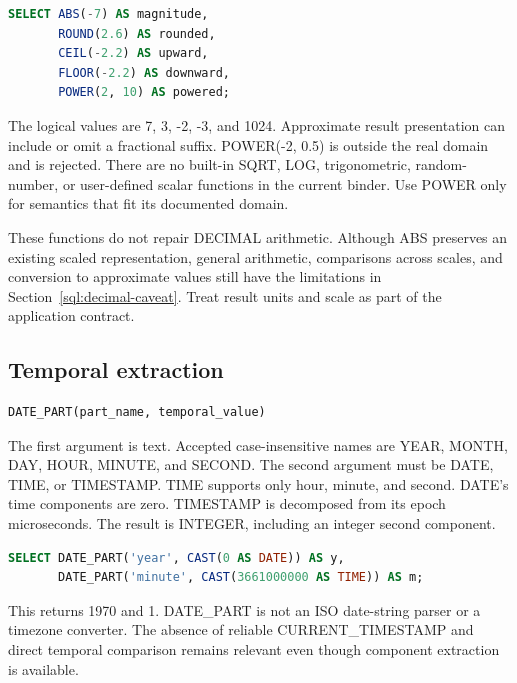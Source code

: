 \begin{lstlisting}[language=SQL]
SELECT ABS(-7) AS magnitude,
       ROUND(2.6) AS rounded,
       CEIL(-2.2) AS upward,
       FLOOR(-2.2) AS downward,
       POWER(2, 10) AS powered;
\end{lstlisting}

The logical values are 7, 3, -2, -3, and 1024. Approximate result presentation can include or omit a fractional suffix. POWER(-2, 0.5) is outside the real domain and is rejected. There are no built-in SQRT, LOG, trigonometric, random-number, or user-defined scalar functions in the current binder. Use POWER only for semantics that fit its documented domain.

These functions do not repair DECIMAL arithmetic. Although ABS preserves an existing scaled representation, general arithmetic, comparisons across scales, and conversion to approximate values still have the limitations in Section~\ref{sql:decimal-caveat}. Treat result units and scale as part of the application contract.

\subsection{Temporal extraction}

\begin{lstlisting}[language=SQL]
DATE_PART(part_name, temporal_value)
\end{lstlisting}

The first argument is text. Accepted case-insensitive names are YEAR, MONTH, DAY, HOUR, MINUTE, and SECOND. The second argument must be DATE, TIME, or TIMESTAMP. TIME supports only hour, minute, and second. DATE's time components are zero. TIMESTAMP is decomposed from its epoch microseconds. The result is INTEGER, including an integer second component.

\begin{lstlisting}[language=SQL]
SELECT DATE_PART('year', CAST(0 AS DATE)) AS y,
       DATE_PART('minute', CAST(3661000000 AS TIME)) AS m;
\end{lstlisting}

This returns 1970 and 1. DATE\_PART is not an ISO date-string parser or a timezone converter. The absence of reliable CURRENT\_TIMESTAMP and direct temporal comparison remains relevant even though component extraction is available.


